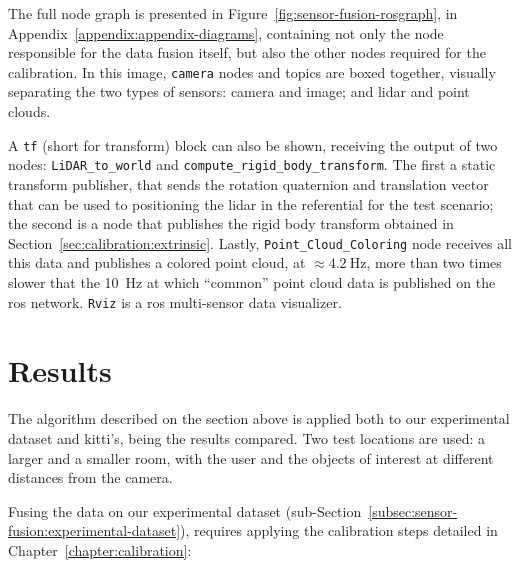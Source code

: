 The full node graph is presented in Figure~\ref{fig:sensor-fusion-rosgraph}, in Appendix~\ref{appendix:appendix-diagrams}, containing not only the node responsible for the data fusion itself, but also the other nodes required for the calibration. In this image, \texttt{camera} nodes and topics are boxed together, visually separating the two types of sensors: camera and image; and \ac{lidar} and point clouds.

A \texttt{tf} (short for transform) block can also be shown, receiving the output of two nodes: \texttt{LiDAR\_to\_world} and \texttt{compute\_rigid\_body\_transform}. The first a static transform publisher, that sends the rotation quaternion and translation vector that can be used to positioning the \ac{lidar} in the referential for the test scenario; the second is a node that publishes the rigid body transform obtained in Section~\ref{sec:calibration:extrinsic}. Lastly, \texttt{Point\_Cloud\_Coloring} node receives all this data and publishes a colored point cloud, at $\approx \SI{4.2}{\hertz}$, more than two times slower that the \SI{10}{\hertz} at which ``common'' point cloud data is published on the \ac{ros} network. \texttt{Rviz} is a \ac{ros} multi-sensor data visualizer.


%		


\section{Results}
The algorithm described on the section above is applied both to our experimental dataset and \ac{kitti}'s, being the results compared. Two test locations are used: a larger and a smaller room, with the user and the objects of interest at different distances from the camera.

Fusing the data on our experimental dataset (sub-Section~\ref{subsec:sensor-fusion:experimental-dataset}), requires applying the calibration steps detailed in Chapter~\ref{chapter:calibration}:

